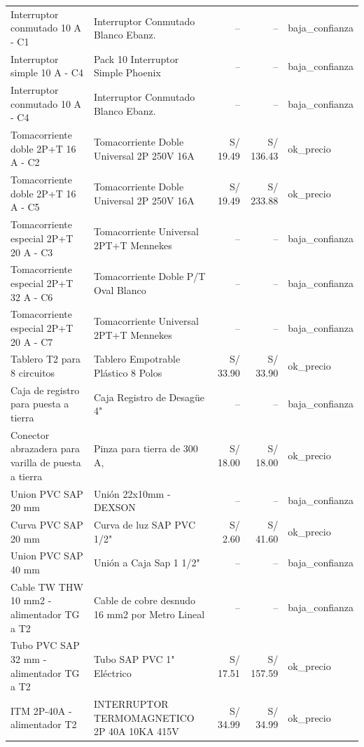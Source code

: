 \documentclass[11pt,a4paper]{article}
\begin{document}
\begin{longtable}{p{} p{} r r p{}}
Interruptor conmutado 10 A - C1 & Interruptor Conmutado Blanco Ebanz. & -- & -- & baja\_confianza \\
Interruptor simple 10 A - C4 & Pack 10 Interruptor Simple Phoenix & -- & -- & baja\_confianza \\
Interruptor conmutado 10 A - C4 & Interruptor Conmutado Blanco Ebanz. & -- & -- & baja\_confianza \\
Tomacorriente doble 2P+T 16 A - C2 & Tomacorriente Doble Universal 2P 250V 16A & S/ 19.49 & S/ 136.43 & ok\_precio \\
Tomacorriente doble 2P+T 16 A - C5 & Tomacorriente Doble Universal 2P 250V 16A & S/ 19.49 & S/ 233.88 & ok\_precio \\
Tomacorriente especial 2P+T 20 A - C3 & Tomacorriente Universal 2PT+T Mennekes & -- & -- & baja\_confianza \\
Tomacorriente especial 2P+T 32 A - C6 & Tomacorriente Doble P/T Oval Blanco & -- & -- & baja\_confianza \\
Tomacorriente especial 2P+T 20 A - C7 & Tomacorriente Universal 2PT+T Mennekes & -- & -- & baja\_confianza \\
Tablero T2 para 8 circuitos & Tablero Empotrable Plástico 8 Polos & S/ 33.90 & S/ 33.90 & ok\_precio \\
Caja de registro para puesta a tierra & Caja Registro de Desagüe 4" & -- & -- & baja\_confianza \\
Conector abrazadera para varilla de puesta a tierra & Pinza para tierra de 300 A, & S/ 18.00 & S/ 18.00 & ok\_precio \\
Union PVC SAP 20 mm & Unión 22x10mm - DEXSON & -- & -- & baja\_confianza \\
Curva PVC SAP 20 mm & Curva de luz SAP PVC 1/2" & S/ 2.60 & S/ 41.60 & ok\_precio \\
Union PVC SAP 40 mm & Unión a Caja Sap 1 1/2" & -- & -- & baja\_confianza \\
Cable TW THW 10 mm2 - alimentador TG a T2 & Cable de cobre desnudo 16 mm2 por Metro Lineal & -- & -- & baja\_confianza \\
Tubo PVC SAP 32 mm - alimentador TG a T2 & Tubo SAP PVC 1" Eléctrico & S/ 17.51 & S/ 157.59 & ok\_precio \\
ITM 2P-40A - alimentador T2 & INTERRUPTOR TERMOMAGNETICO 2P 40A 10KA 415V & S/ 34.99 & S/ 34.99 & ok\_precio \\
\bottomrule\end{longtable}
\end{document}
